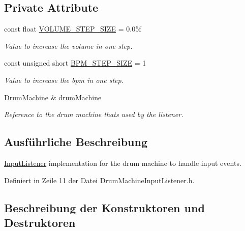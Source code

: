 \subsection*{Private Attribute}
\begin{DoxyCompactItemize}
\item 
const float \hyperlink{class_drum_machine_input_listener_a983e85ff0ebfbb3de0a917134488570c}{V\+O\+L\+U\+M\+E\+\_\+\+S\+T\+E\+P\+\_\+\+S\+I\+ZE} = 0.\+05f
\begin{DoxyCompactList}\small\item\em Value to increase the volume in one step. \end{DoxyCompactList}\item 
const unsigned short \hyperlink{class_drum_machine_input_listener_ad4f83d21be6ff1ba703a27d8c9a04c9a}{B\+P\+M\+\_\+\+S\+T\+E\+P\+\_\+\+S\+I\+ZE} = 1
\begin{DoxyCompactList}\small\item\em Value to increase the bpm in one step. \end{DoxyCompactList}\item 
\hyperlink{class_drum_machine}{Drum\+Machine} \& \hyperlink{class_drum_machine_input_listener_ae3f80aad0a5c4b2e4ad2712423102feb}{drum\+Machine}
\begin{DoxyCompactList}\small\item\em Reference to the drum machine thats used by the listener. \end{DoxyCompactList}\end{DoxyCompactItemize}


\subsection{Ausführliche Beschreibung}
\hyperlink{class_input_listener}{Input\+Listener} implementation for the drum machine to handle input events. 

Definiert in Zeile 11 der Datei Drum\+Machine\+Input\+Listener.\+h.



\subsection{Beschreibung der Konstruktoren und Destruktoren}
\mbox{\label{class_drum_machine_input_listener_a7552c36ebae9e6ae49f8929ae9853354}} 
